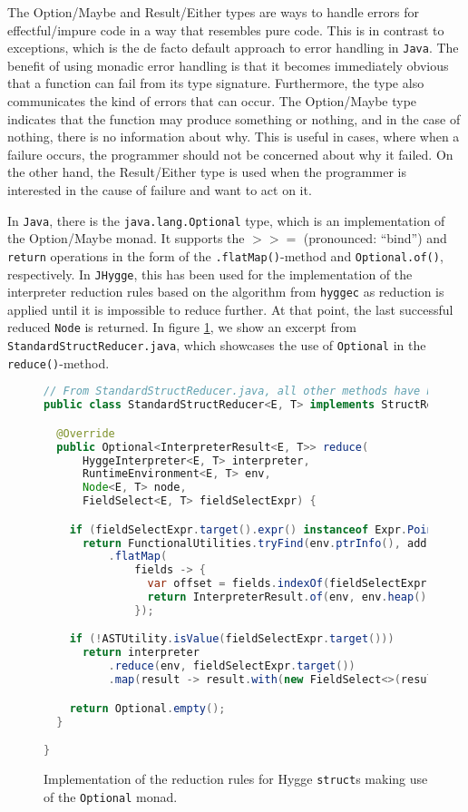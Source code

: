 The Option/Maybe and Result/Either types are ways to handle errors for effectful/impure code in a way that resembles pure code.
This is in contrast to exceptions, which is the de facto default approach to error handling in \texttt{Java}. The benefit
of using monadic error handling is that it becomes immediately obvious that a function can fail from its type signature.
Furthermore, the type also communicates the kind of errors that can occur. The Option/Maybe type indicates that the function
may produce something or nothing, and in the case of nothing, there is no information about why. This is useful in cases,
where when a failure occurs, the programmer should not be concerned about why it failed. On the other hand, the Result/Either
type is used when the programmer is interested in the cause of failure and want to act on it.

In \texttt{Java}, there is the \texttt{java.lang.Optional}\cite{java_optional} type, which is an implementation of the Option/Maybe monad. It
supports the $>>=$ (pronounced: ``bind'') and \texttt{return} operations in the form of the \texttt{.flatMap()}-method
and \texttt{Optional.of()}, respectively. In \texttt{JHygge}, this has been used for the implementation of the interpreter
reduction rules based on the algorithm from \texttt{hyggec} as reduction is applied until it is impossible to reduce further.
At that point, the last successful reduced \texttt{Node} is returned. In figure \ref{fig:struct_reducer_monads}, we show an excerpt from
\texttt{StandardStructReducer.java}, which showcases the use of \texttt{Optional} in the \texttt{reduce()}-method.

\begin{figure}[H]
\centering  
\begin{lstlisting}[language=Java]
// From StandardStructReducer.java, all other methods have been redacted ...
public class StandardStructReducer<E, T> implements StructReducer<E, T> {

  @Override
  public Optional<InterpreterResult<E, T>> reduce(
      HyggeInterpreter<E, T> interpreter,
      RuntimeEnvironment<E, T> env,
      Node<E, T> node,
      FieldSelect<E, T> fieldSelectExpr) {

    if (fieldSelectExpr.target().expr() instanceof Expr.Pointer<E, T>(int address))
      return FunctionalUtilities.tryFind(env.ptrInfo(), address)
          .flatMap(
              fields -> {
                var offset = fields.indexOf(fieldSelectExpr.field());
                return InterpreterResult.of(env, env.heap().get(address + offset));
              });

    if (!ASTUtility.isValue(fieldSelectExpr.target()))
      return interpreter
          .reduce(env, fieldSelectExpr.target())
          .map(result -> result.with(new FieldSelect<>(result.node(), fieldSelectExpr.field())));

    return Optional.empty();
  }

}
\end{lstlisting}
\caption{Implementation of the reduction rules for Hygge \texttt{struct}s making use of the \texttt{Optional} monad.}
\label{fig:struct_reducer_monads}
\end{figure}

